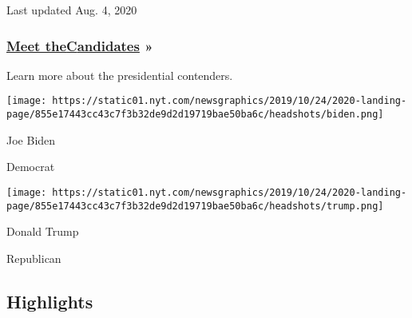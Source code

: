 Last updated Aug. 4, 2020

\hypertarget{meet-thecandidates-}{%
\subsubsection{\texorpdfstring{\href{https://www.nytimes.com/interactive/2019/us/politics/2020-presidential-candidates.html}{Meet
the}\href{https://www.nytimes.com/interactive/2019/us/politics/2020-presidential-candidates.html}{C}\href{https://www.nytimes.com/interactive/2019/us/politics/2020-presidential-candidates.html}{andidates}
»}{Meet theCandidates »}}\label{meet-thecandidates-}}

Learn more about the presidential contenders.

\href{https://www.nytimes.com/interactive/2020/us/elections/joe-biden.html}{}

\texttt{[image: https://static01.nyt.com/newsgraphics/2019/10/24/2020-landing-page/855e17443cc43c7f3b32de9d2d19719bae50ba6c/headshots/biden.png]}

Joe Biden

Democrat

\href{https://www.nytimes.com/interactive/2020/us/elections/donald-trump.html}{}

\texttt{[image: https://static01.nyt.com/newsgraphics/2019/10/24/2020-landing-page/855e17443cc43c7f3b32de9d2d19719bae50ba6c/headshots/trump.png]}

Donald Trump

Republican

\hypertarget{highlights}{%
\subsection{Highlights}\label{highlights}}

